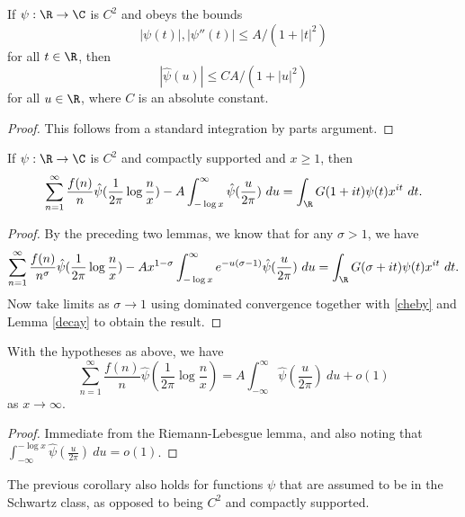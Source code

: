 \begin{lemma}\label{decay}  If $\psi:\R \to \C$ is $C^2$ and obeys the bounds
  $$ |\psi(t)|, |\psi''(t)| \leq A / (1 + |t|^2)$$
  for all $t \in \R$, then
$$ |\hat \psi(u)| \leq C A / (1+|u|^2)$$
for all $u \in \R$, where $C$ is an absolute constant.
\end{lemma}

\begin{proof} This follows from a standard integration by parts argument.
\end{proof}

\begin{lemma}\label{limiting}  If $\psi: \R \to \C$ is $C^2$ and compactly supported and $x \geq 1$, then
$$ \sum_{n=1}^\infty \frac{f(n)}{n} \hat \psi( \frac{1}{2\pi} \log \frac{n}{x} ) - A \int_{-\log x}^\infty \hat \psi(\frac{u}{2\pi})\ du =  \int_\R G(1+it) \psi(t) x^{it}\ dt.$$
\end{lemma}

\begin{proof}
 By the preceding two lemmas, we know that for any $\sigma>1$, we have
  $$ \sum_{n=1}^\infty \frac{f(n)}{n^\sigma} \hat \psi( \frac{1}{2\pi} \log \frac{n}{x} ) - A x^{1-\sigma} \int_{-\log x}^\infty e^{-u(\sigma-1)} \hat \psi(\frac{u}{2\pi})\ du =  \int_\R G(\sigma+it) \psi(t) x^{it}\ dt.$$
  Now take limits as $\sigma \to 1$ using dominated convergence together with \eqref{cheby} and Lemma \ref{decay} to obtain the result.
\end{proof}

\begin{corollary}\label{limiting-cor}  With the hypotheses as above, we have
  $$ \sum_{n=1}^\infty \frac{f(n)}{n} \hat \psi( \frac{1}{2\pi} \log \frac{n}{x} ) = A \int_{-\infty}^\infty \hat \psi(\frac{u}{2\pi})\ du + o(1)$$
  as $x \to \infty$.
\end{corollary}

\begin{proof}
 Immediate from the Riemann-Lebesgue lemma, and also noting that $\int_{-\infty}^{-\log x} \hat \psi(\frac{u}{2\pi})\ du = o(1)$.
\end{proof}

\begin{lemma}\label{schwarz-id}  The previous corollary also holds for functions $\psi$ that are assumed to be in the Schwartz class, as opposed to being $C^2$ and compactly supported.
\end{lemma}

